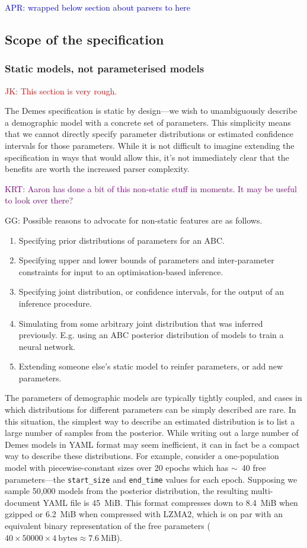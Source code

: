 \documentclass[11pt]{article}
\newcommand{\aprcomment}[1]{{\textcolor{blue}{APR: #1}}}
\newcommand{\jkcomment}[1]{{\textcolor{red}{JK: #1}}}
\newcommand{\ggcomment}[1]{{\textcolor{yellow!60!red}{GG: #1}}}
\newcommand{\krtcomment}[1]{{\textcolor{purple}{KRT: #1}}}
\begin{document}
\aprcomment{wrapped below section about parsers to here}

\subsection*{Scope of the specification}
\subsubsection*{Static models, not parameterised models}
\jkcomment{This section is very rough.}


The Demes specification is static by design---we wish to
unambiguously describe a demographic model with a concrete set
of parameters. This simplicity means that we cannot directly
specify parameter distributions or estimated confidence intervals
for those parameters. While it is not difficult to imagine extending
the specification in ways that would allow this, it's not immediately
clear that the benefits are worth the increased parser complexity.

\krtcomment{Aaron has done a bit of this non-static stuff in moments.  It may be useful to look over there?}

\ggcomment{
Possible reasons to advocate for non-static features are as follows.
\begin{enumerate}
\item Specifying prior distributions of parameters for an ABC.
\item Specifying upper and lower bounds of parameters and inter-parameter
      constraints for input to an optimisation-based inference.
\item Specifying joint distribution, or confidence intervals, for the output of
      an inference procedure.
\item Simulating from some arbitrary joint distribution that was inferred
      previously. E.g. using an ABC posterior distribution of models to
      train a neural network.
\item Extending someone else's static model to reinfer parameters,
      or add new parameters.
\end{enumerate}
}

The parameters of
demographic models are typically tightly coupled, and cases in which
distributions for different parameters can be simply described are rare.
In this situation, the simplest way to describe an estimated
distribution is to list a large number of samples from
the posterior. While writing out a large number of Demes models in
YAML format may seem inefficient, it can in fact be a compact
way to describe these distributions.
For example, consider a one-population model with piecewise-constant sizes over
20 epochs which has $\sim$~40 free parameters---the \texttt{start\_size} and
\texttt{end\_time} values for each epoch. Supposing we sample 50,000 models
from the posterior distribution, the resulting multi-document YAML file is
45~MiB.
This format compresses down to 8.4~MiB when gzipped or 6.2~MiB
when compressed with LZMA2, which is on par with an equivalent binary
representation of the free parameters
($40\times50000\times4~\text{bytes} \approx 7.6~\text{MiB}$).
\end{document}
